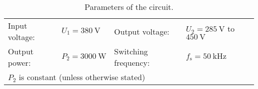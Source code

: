 
\begin{table}[ht]
    \centering  %
    \begin{tabular}{llll}
        \toprule
        
        Input voltage: &  $U_{\mathrm{1}} = \SI{380}{\volt}$ & Output voltage: & $U_{\mathrm{2}} = \SI{285}{\volt}$  to $\SI{450}{\volt}$\\ 
        Output power: & $P_{\mathrm{2}} = \SI{3000}{\watt}$ & Switching frequency: & $f_{\mathrm{s}} = \SI{50}{\kilo\hertz}$ \\ 
        \multicolumn{4}{l}{$P_{\mathrm{2}}$ is constant (unless otherwise stated)} \\
        \bottomrule
    \end{tabular}
    \caption{Parameters of the circuit.}  %
    \label{table:Parameters of the buck-boost converter.}
\end{table}